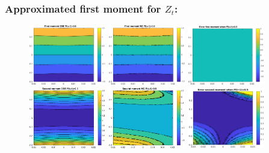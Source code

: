 \documentclass[aspectratio=169]{beamer}\usepackage[utf8]{inputenc}
\begin{document}
\begin{frame}\frametitle{Approximated first moment for $Z_t$:}

\begin{figure}[ht!]
\centering
\includegraphics[width=0.3\textwidth]{../../MATLAB_Files/Results/moments/lamperti/errors/fm_ODE_4.eps}\quad
\includegraphics[width=0.3\textwidth]{../../MATLAB_Files/Results/moments/lamperti/errors/fm_MC_4.eps}\quad
\includegraphics[width=0.3\textwidth]{../../MATLAB_Files/Results/moments/lamperti/errors/fm_4.eps}\quad
\includegraphics[width=0.3\textwidth]{../../MATLAB_Files/Results/moments/lamperti/errors/sm_ODE_4.eps}\quad
\includegraphics[width=0.3\textwidth]{../../MATLAB_Files/Results/moments/lamperti/errors/sm_MC_4.eps}\quad
\includegraphics[width=0.3\textwidth]{../../MATLAB_Files/Results/moments/lamperti/errors/sm_4.eps}
\end{figure}

\end{frame}
\end{document}
